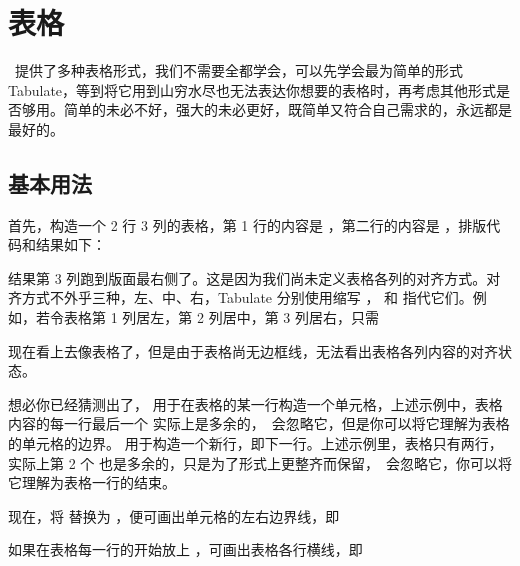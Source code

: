 \chapter{表格}

\ConTeXt\ 提供了多种表格形式，我们不需要全都学会，可以先学会最为简单的形式 Tabulate，等到将它用到山穷水尽也无法表达你想要的表格时，再考虑其他形式是否够用。简单的未必不好，强大的未必更好，既简单又符合自己需求的，永远都是最好的。

\section{基本用法}

首先，构造一个 2 行 3 列的表格，第 1 行的内容是 ，第二行的内容是 ，排版代码和结果如下：

\starttyping[option=TEX]
\starttabulate
{}  \NC\NR
{}  \NC\NR
\stoptabulate
\stoptyping
\starttabulate
{}  \NC\NR
{}  \NC\NR
\stoptabulate

结果第 3 列跑到版面最右侧了。这是因为我们尚未定义表格各列的对齐方式。对齐方式不外乎三种，左、中、右，Tabulate 分别使用缩写 ， 和  指代它们。例如，若令表格第 1 列居左，第 2 列居中，第 3 列居右，只需

\starttyping[option=TEX]
\starttabulate[|l|c|r|]
  \NC\NR
{}  \NC\NR
\stoptabulate
\stoptyping
\starttabulate[|l|c|r|]
  \NC\NR
{}  \NC\NR
\stoptabulate

现在看上去像表格了，但是由于表格尚无边框线，无法看出表格各列内容的对齐状态。

想必你已经猜测出了，\type{\NC} 用于在表格的某一行构造一个单元格，上述示例中，表格内容的每一行最后一个 \type{\NC} 实际上是多余的，\ConTeXt\ 会忽略它，但是你可以将它理解为表格的单元格的边界。\type{\NR} 用于构造一个新行，即下一行。上述示例里，表格只有两行，实际上第 2 个 \type{\NR} 也是多余的，只是为了形式上更整齐而保留，\ConTeXt\ 会忽略它，你可以将它理解为表格一行的结束。

现在，将 \type{\NC} 替换为 \type{\VL}，便可画出单元格的左右边界线，即

\starttyping[option=TEX]
\starttabulate[|l|c|r|]
  \VL\NR
{}  \VL\NR
\stoptabulate
\stoptyping

\starttabulate[|l|c|r|]
  \VL\NR
{}  \VL\NR
\stoptabulate

如果在表格每一行的开始放上 \type{\HL}，可画出表格各行横线，即

